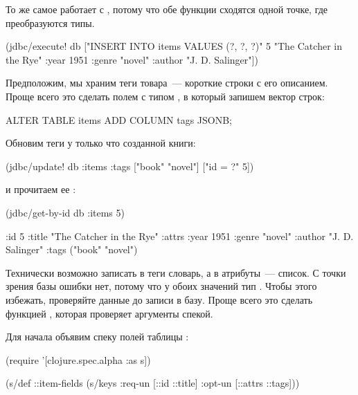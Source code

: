 То же самое работает с , потому что обе функции сходятся одной точке, где преобразуются типы.

\begin{english}
  \begin{clojure}
(jdbc/execute!
  db
  ["INSERT INTO items VALUES (?, ?, ?)"
  5
  "The Catcher in the Rye"
  {:year 1951 :genre "novel"
   :author "J. D. Salinger"}])
  \end{clojure}
\end{english}

Предположим, мы храним теги товара~--- короткие строки с его описанием. Проще всего это сделать полем  с типом , в который запишем вектор строк:

\begin{english}
  \begin{sql}
ALTER TABLE items ADD COLUMN tags JSONB;
  \end{sql}
\end{english}

Обновим теги у только что созданной книги:

\begin{english}
  \begin{clojure}
(jdbc/update! db :items
              {:tags ["book" "novel"]}
              ["id = ?" 5])
  \end{clojure}
\end{english}


\noindent
и прочитаем ее :

\begin{english}
  \begin{clojure/lines}
(jdbc/get-by-id db :items 5)

{:id 5
 :title "The Catcher in the Rye"
 :attrs {:year 1951 :genre "novel"
         :author "J. D. Salinger"}
 :tags ("book" "novel")}
  \end{clojure/lines}
\end{english}

Технически возможно записать в теги словарь, а в атрибуты~--- список. С точки зрения базы ошибки нет, потому что у обоих значений тип . Чтобы этого избежать, проверяйте данные до записи в базу. Проще всего это сделать функцией , которая проверяет аргументы спекой.

Для начала объявим спеку полей таблицы :

\begin{english}
  \begin{clojure}
(require '[clojure.spec.alpha :as s])

(s/def ::item-fields
  (s/keys :req-un [::id ::title]
          :opt-un [::attrs ::tags]))
  \end{clojure}
\end{english}

